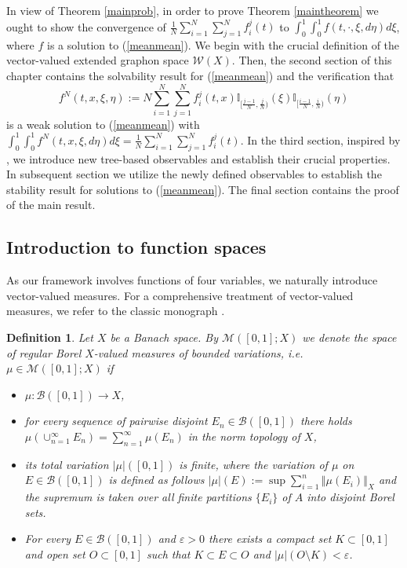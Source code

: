 \documentclass[10pt]{article}
\newtheorem{defi}{Definition}
\newcommand*{\norm}[1]{\left\Vert{#1}\right\Vert}
\newcommand*{\abs}[1]{\left\vert{#1}\right\vert}
\newcommand{\ve}{\varepsilon}
\newcommand{\izj}{\int_{0}^{1}}
\newcommand{\fji}{f^j_i}
\newcommand{\W}{\mathcal{W}}
\begin{document}
In view of Theorem \ref{mainprob}, in order to prove Theorem \ref{maintheorem} we ought to show the convergence of $\frac{1}{N}\sum_{i=1}^N\sum_{j=1}^N\fji(t)$ to $\izj\izj f(t,\cdot,\xi,d\eta)d\xi$, where $f$ is a solution to (\ref{meanmean}). 
We begin with the crucial definition of the vector-valued extended graphon space $\W(X)$. Then, the second section of this chapter contains the solvability result for (\ref{meanmean}) and the verification that
\[
f^N(t,x,\xi,\eta):= N\sum_{i=1}^N \sum_{j=1}^N \fji(t,x)\mathbb{I}_{[\frac{j-1}{N},\frac{j}{N})}(\xi)\mathbb{I}_{[\frac{i-1}{N},\frac{i}{N})}(\eta)
\]
is a weak solution to (\ref{meanmean}) with $\izj \izj f^N(t,x,\xi,d\eta)d\xi =\frac{1}{N}\sum_{i=1}^N\sum_{j=1}^N\fji(t)$. 
In the third section, inspired by \cite{JPS2025},  we introduce new tree-based observables and establish their crucial properties. In subsequent section we utilize the newly defined observables to establish the stability result for solutions to (\ref{meanmean}). The final section contains the proof of the main result.
\subsection{Introduction to function spaces }



As our framework involves functions of four variables, we naturally introduce vector-valued measures. For a comprehensive treatment of vector-valued measures, we refer to the classic monograph \cite{DU1977}.

\begin{defi}\label{measurex}
Let $X$ be a Banach space. By $\mathcal{M}([0,1];X)$ we denote the space of regular Borel $X$-valued measures of bounded variations, i.e. $\mu \in \mathcal{M}([0,1];X)$ if
\begin{itemize}
\item $\mu:\mathcal{B}([0,1])\rightarrow X$,
\item for every sequence of pairwise disjoint $E_n \in \mathcal{B}([0,1])$ there holds $\mu\left(\cup_{n=1}^{\infty}E_n\right) = \sum_{n=1}^{\infty}\mu(E_n)$ in the norm topology of $X$,
\item its total variation $\abs{\mu}([0,1])$ is finite, where the variation of $\mu$ on $E \in \mathcal{B}([0,1])$ is defined as follows $\abs{\mu}(E):=\sup\sum_{i=1}^n\norm{\mu(E_i)}_{X}$ and the supremum is taken over all finite partitions $\{E_i\}$ of $A$ into disjoint Borel sets.
\item For every $E \in \mathcal{B}([0,1])$ and $\ve > 0$ there exists a compact set $K\subset [0,1]$ and open set $O\subset [0,1]$ such that $K\subset E\subset O$ and $\abs{\mu}(O\setminus K) < \ve$.
\end{itemize}
\end{defi}
\end{document}
